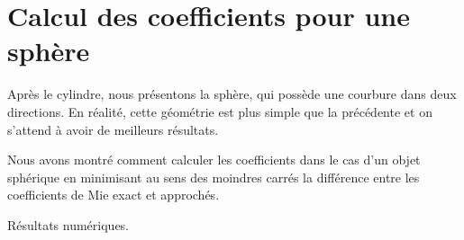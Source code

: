 \chapter{Calcul des coefficients pour une sphère}
\label{sec:sphere}
\minitoc
\newpage
{}
Après le cylindre, nous présentons la sphère, qui possède une courbure dans deux directions. En réalité, cette géométrie est plus simple que la précédente et on s'attend à avoir de meilleurs résultats. 






Nous avons montré comment calculer les coefficients dans le cas d'un objet sphérique en minimisant au sens des moindres carrés la différence entre les coefficients de Mie exact et approchés. 


\begin{TODO}
  Résultats numériques.
\end{TODO}